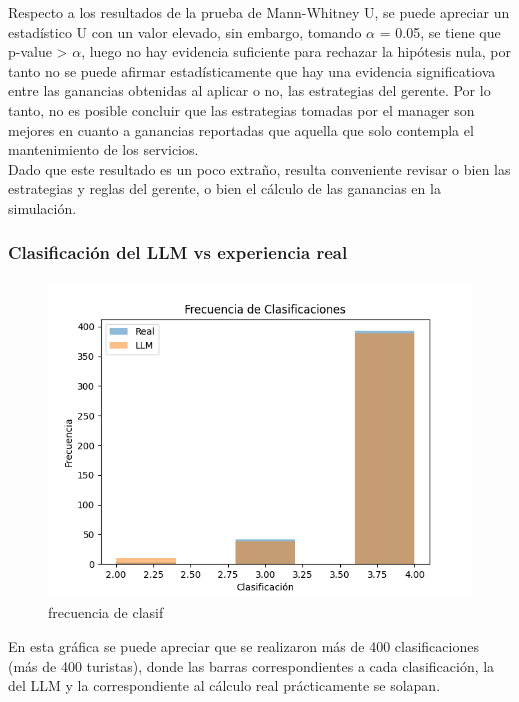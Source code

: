\documentclass[12pt,a4paper]{article} \usepackage[spanish]{babel} \usepackage{graphicx} \usepackage{amsmath} \usepackage{amsfonts} \usepackage{amssymb} \usepackage{float} \usepackage{geometry}
\begin{document}
Respecto a los resultados de la prueba de Mann-Whitney U, se puede apreciar un estadístico U con un valor elevado, sin embargo, tomando $\alpha$ = 0.05, se tiene que p-value > $\alpha$, luego no hay evidencia suficiente para rechazar la hipótesis nula, por tanto no se puede afirmar estadísticamente que hay una evidencia significatiova entre las ganancias obtenidas al aplicar o no, las estrategias del gerente. Por lo tanto, no es posible concluir que las estrategias tomadas por el manager son mejores en cuanto a ganancias reportadas que aquella que solo contempla el mantenimiento de los servicios.\\
Dado que este resultado es un poco extraño, resulta conveniente revisar o bien las estrategias y reglas del gerente, o bien el cálculo de las ganancias en la simulación.

\subsubsection{Clasificación del LLM vs experiencia real}
\begin{figure}[H] \centering \includegraphics[width=\textwidth]{Frecuencia de clasificaciones_last} \caption{frecuencia de clasif} \label{fig:etiqueta} \end{figure}
En esta gráfica se puede apreciar que se realizaron más de 400 clasificaciones (más de 400 turistas), donde las barras correspondientes a cada clasificación, la del LLM y la correspondiente al cálculo real prácticamente se solapan.
\end{document}
